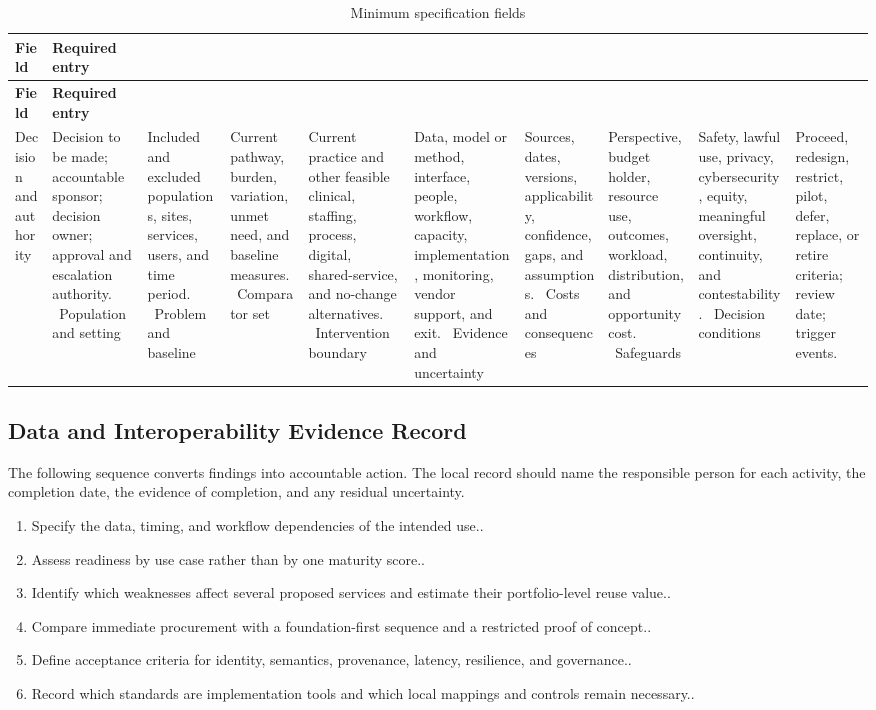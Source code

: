 \begin{longtable}{@{}p{}p{}@{}}
\caption{Minimum specification fields}
\label{tab:comp-ch02-spec-fields}\\
\toprule
\textbf{Field} & \textbf{Required entry} \\
\midrule
\endfirsthead
\toprule
\textbf{Field} & \textbf{Required entry} \\
\midrule
\endhead
\bottomrule
\endlastfoot
Decision and authority & Decision to be made; accountable sponsor; decision owner; approval and escalation authority. \
Population and setting & Included and excluded populations, sites, services, users, and time period. \
Problem and baseline & Current pathway, burden, variation, unmet need, and baseline measures. \
Comparator set & Current practice and other feasible clinical, staffing, process, digital, shared-service, and no-change alternatives. \
Intervention boundary & Data, model or method, interface, people, workflow, capacity, implementation, monitoring, vendor support, and exit. \
Evidence and uncertainty & Sources, dates, versions, applicability, confidence, gaps, and assumptions. \
Costs and consequences & Perspective, budget holder, resource use, outcomes, workload, distribution, and opportunity cost. \
Safeguards & Safety, lawful use, privacy, cybersecurity, equity, meaningful oversight, continuity, and contestability. \
Decision conditions & Proceed, redesign, restrict, pilot, defer, replace, or retire criteria; review date; trigger events. \
\end{longtable}

\subsection{Data and Interoperability Evidence Record}
\label{sec:comp-ch02-supp-2}
The following sequence converts findings into accountable action. The local record
should name the responsible person for each activity, the completion date, the
evidence of completion, and any residual uncertainty.

\begin{enumerate}
 \item Specify the data, timing, and workflow dependencies of the intended use..
 \item Assess readiness by use case rather than by one maturity score..
 \item Identify which weaknesses affect several proposed services and estimate their portfolio-level reuse value..
 \item Compare immediate procurement with a foundation-first sequence and a restricted proof of concept..
 \item Define acceptance criteria for identity, semantics, provenance, latency, resilience, and governance..
 \item Record which standards are implementation tools and which local mappings and controls remain necessary..
\end{enumerate}

